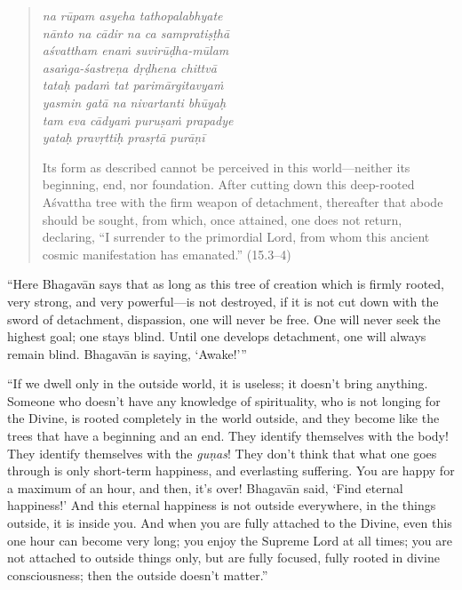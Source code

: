 \documentclass[12pt, twoside, openright]{memoir}
\begin{document}
\par
\begin{verse}
\textit{na rūpam asyeha tathopalabhyate} \\
\textit{nānto na cādir na ca sampratiṣṭhā} \\
\textit{aśvattham enaṁ suvirūḍha-mūlam} \\
\textit{asaṅga-śastreṇa dṛḍhena chittvā} \\
\textit{tataḥ padaṁ tat parimārgitavyaṁ} \\
\textit{yasmin gatā na nivartanti bhūyaḥ} \\
\textit{tam eva cādyaṁ puruṣaṁ prapadye} \\
\textit{yataḥ pravṛttiḥ prasṛtā purāṇī}

\noindent Its form as described cannot be perceived in this world---neither its beginning, end, nor foundation. After cutting down this deep-rooted Aśvattha tree with the firm weapon of detachment, thereafter that abode should be sought, from which, once attained, one does not return, declaring, \enquote{I surrender to the primordial Lord, from whom this ancient cosmic manifestation has emanated.} (15.3–4)
\end{verse}
\par


\enquote{Here Bhagavān says that as long as this tree of creation which is firmly rooted, very strong, and very powerful---is not destroyed, if it is not cut down with the sword of detachment, dispassion, one will never be free. One will never seek the highest goal; one stays blind. Until one develops detachment, one will always remain blind. Bhagavān is saying, \enquote{Awake!}}

\enquote{If we dwell only in the outside world, it is useless; it doesn’t bring anything. Someone who doesn’t have any knowledge of spirituality, who is not longing for the Divine, is rooted completely in the world outside, and they become like the trees that have a beginning and an end. They identify themselves with the body! They identify themselves with the \textit{guṇas}! They don’t think that what one goes through is only short-term happiness, and everlasting suffering. You are happy for a maximum of an hour, and then, it’s over! Bhagavān said, \enquote{Find eternal happiness!} And this eternal happiness is not outside everywhere, in the things outside, it is inside you. And when you are fully attached to the Divine, even this one hour can become very long; you enjoy the Supreme Lord at all times; you are not attached to outside things only, but are fully focused, fully rooted in divine consciousness; then the outside doesn’t matter.}
\end{document}
